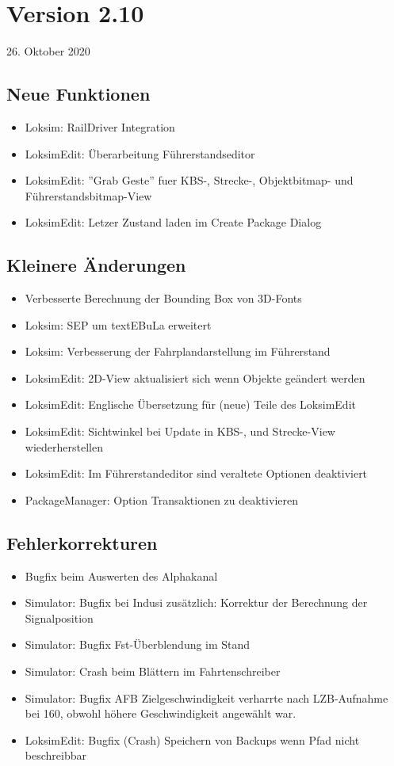 \section{Version 2.10}\hfill 26. Oktober 2020
\subsection{Neue Funktionen}
\begin{itemize}
    \item Loksim: RailDriver Integration
    \item LoksimEdit: Überarbeitung Führerstandseditor
    \item LoksimEdit: ''Grab Geste'' fuer KBS-, Strecke-, Objektbitmap- und Führerstandsbitmap-View
    \item LoksimEdit: Letzer Zustand laden im Create Package Dialog
\end{itemize}


\subsection{Kleinere Änderungen}
\begin{itemize}
    \item Verbesserte Berechnung der Bounding Box von 3D-Fonts
    \item Loksim: SEP um textEBuLa erweitert
    \item Loksim: Verbesserung der Fahrplandarstellung im Führerstand
    \item LoksimEdit: 2D-View aktualisiert sich wenn Objekte geändert werden
    \item LoksimEdit: Englische Übersetzung für (neue) Teile des LoksimEdit
    \item LoksimEdit: Sichtwinkel bei Update in KBS-, und Strecke-View wiederherstellen
    \item LoksimEdit: Im Führerstandeditor sind veraltete Optionen deaktiviert
    \item PackageManager: Option Transaktionen zu deaktivieren
\end{itemize}

\subsection{Fehlerkorrekturen}
\begin{itemize}
    \item Bugfix beim Auswerten des Alphakanal
    \item Simulator: Bugfix bei Indusi zusätzlich: Korrektur der Berechnung der Signalposition
    \item Simulator: Bugfix Fst-Überblendung im Stand
    \item Simulator: Crash beim Blättern im Fahrtenschreiber
	\item Simulator: Bugfix AFB Zielgeschwindigkeit verharrte nach LZB-Aufnahme bei 160, obwohl höhere Geschwindigkeit angewählt war.
    \item LoksimEdit: Bugfix (Crash) Speichern von Backups wenn Pfad nicht beschreibbar
\end{itemize}


